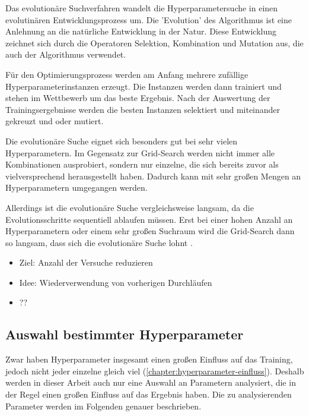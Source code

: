 Das evolutionäre Suchverfahren wandelt die Hyperparametersuche in einen evolutinären Entwicklungsprozess um.
Die 'Evolution' des Algorithmus ist eine Anlehnung an die natürliche Entwicklung in der Natur.
Diese Entwicklung zeichnet sich durch die Operatoren Selektion, Kombination und Mutation aus, die auch der Algorithmus verwendet. \cite{hyperparameters-search-comparison-focus-genetic, hyperparameters-genetic-algorithm}
\newline

Für den Optimierungsprozess werden am Anfang mehrere zufällige Hyperparameterinstanzen erzeugt.
Die Instanzen werden dann trainiert und stehen im Wettbewerb um das beste Ergebnis.
Nach der Auswertung der Trainingsergebnisse werden die besten Instanzen selektiert und miteinander gekreuzt und oder mutiert.
\newline

Die evolutionäre Suche eignet sich besonders gut bei sehr vielen Hyperparametern.
Im Gegensatz zur Grid-Search werden nicht immer alle Kombinationen ausprobiert, sondern nur einzelne, die sich bereits zuvor als vielversprechend herausgestellt haben.
Dadurch kann mit sehr großen Mengen an Hyperparametern umgegangen werden.

Allerdings ist die evolutionäre Suche vergleichsweise langsam, da die Evolutionsschritte sequentiell ablaufen müssen.
Erst bei einer hohen Anzahl an Hyperparametern oder einem sehr großen Suchraum wird die Grid-Search dann so langsam, dass sich die evolutionäre Suche lohnt \cite{hyperparameters-search-comparison-focus-genetic}.


\begin{itemize}
	\item Ziel: Anzahl der Versuche reduzieren
	\item Idee: Wiederverwendung von vorherigen Durchläufen
	\item ??
\end{itemize}

\subsection{Auswahl bestimmter Hyperparameter}
\label{chapter:hyperparameter-arten}
Zwar haben Hyperparameter insgesamt einen großen Einfluss auf das Training, jedoch nicht jeder einzelne gleich viel (\cref{chapter:hyperparameter-einfluss}).
Deshalb werden in dieser Arbeit auch nur eine Auswahl an Parametern analysiert, die in der Regel einen großen Einfluss auf das Ergebnis haben. 
Die zu analysierenden Parameter werden im Folgenden genauer beschrieben.

